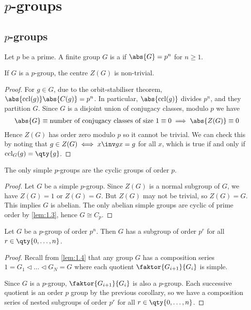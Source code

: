 \section{$p$-groups}

\subsection{$p$-groups}
\begin{definition}[$p$-group]
	Let $p$ be a prime.
	A finite group $G$ is a  if $\abs{G} = p^n$ for $n \geq 1$.
\end{definition}

\begin{theorem}
	If $G$ is a $p$-group, the centre $Z(G)$ is non-trivial.
\end{theorem}

\begin{proof}
	For $g \in G$, due to the orbit-stabiliser theorem, $\abs{\ccl(g)} \abs{C(g)} = p^n$.
	In particular, $\abs{\ccl(g)}$ divides $p^n$, and they partition $G$.
	Since $G$ is a disjoint union of conjugacy classes, modulo $p$ we have
	\begin{align*}
		\abs{G} \equiv \text{number of conjugacy classes of size } 1 \equiv 0 \implies \abs{Z(G)} \equiv 0
	\end{align*}
	Hence $Z(G)$ has order zero modulo $p$ so it cannot be trivial.
	We can check this by noting that $g \in Z(G) \iff x\inv g x = g$ for all $x$, which is true if and only if $\ccl_G(g) = \qty{g}$.
\end{proof}

\begin{corollary}
	The only simple $p$-groups are the cyclic groups of order $p$.
\end{corollary}

\begin{proof}
	Let $G$ be a simple $p$-group.
	Since $Z(G)$ is a normal subgroup of $G$, we have $Z(G) = 1$ or $Z(G) = G$.
	But $Z(G)$ may not be trivial, so $Z(G) = G$.
	This implies $G$ is abelian.
	The only abelian simple groups are cyclic of prime order by \cref{lem:1.3}, hence $G \cong C_p$.
\end{proof}

\begin{corollary}
	Let $G$ be a $p$-group of order $p^n$.
	Then $G$ has a subgroup of order $p^r$ for all $r \in \qty{0, \dots, n}$.
\end{corollary}

\begin{proof}
	Recall from \cref{lem:1.4} that any group $G$ has a composition series $1 = G_1 \triangleleft \dots \triangleleft G_N = G$ where each quotient $\faktor{G_{i+1}}{G_i}$ is simple.

	Since $G$ is a $p$-group, $\faktor{G_{i+1}}{G_i}$ is also a $p$-group.
	Each successive quotient is an order $p$ group by the previous corollary, so we have a composition series of nested subgroups of order $p^r$ for all $r \in \qty{0, \dots, n}$.
\end{proof}

